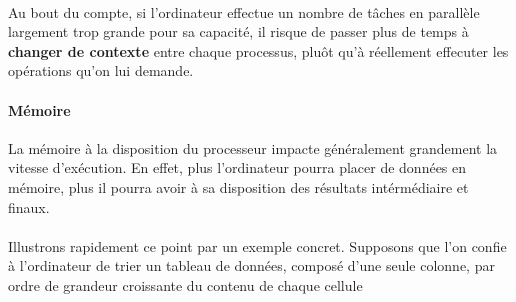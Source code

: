 {  \paragraph{} Au bout du compte, si l'ordinateur effectue un nombre de tâches en parallèle
  largement trop grande pour sa capacité, il risque de passer plus de temps à \textbf{changer de
  contexte} entre chaque processus, pluôt qu'à réellement effecuter les opérations qu'on lui
  demande.

  \paragraph{Mémoire} La mémoire à la disposition du processeur impacte généralement grandement la
  vitesse d'exécution. En effet, plus l'ordinateur pourra placer de données en mémoire, plus il
  pourra avoir à sa disposition des résultats intérmédiaire et finaux.

  \paragraph{} Illustrons rapidement ce point par un exemple concret. Supposons que l'on confie à
  l'ordinateur de trier un tableau de données, composé d'une seule colonne, par ordre de grandeur
  croissante du contenu de chaque cellule
}
